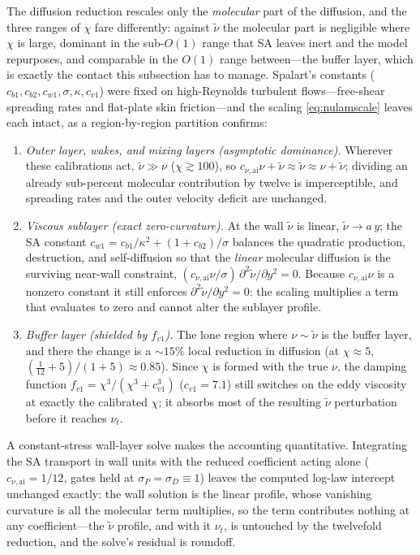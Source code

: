 \documentclass[journal]{new-aiaa}
\begin{document}
The diffusion reduction rescales only the \emph{molecular} part of the
diffusion, and the three ranges of $\chi$ fare differently: against
$\tilde\nu$ the molecular part is negligible where $\chi$ is large, dominant
in the sub-$O(1)$ range that SA leaves inert and the model repurposes, and
comparable in the $O(1)$ range between---the buffer layer, which is exactly
the contact this subsection has to manage.
Spalart's constants ($c_{b1},c_{b2},c_{w1},\sigma,\kappa,c_{v1}$) were fixed on
high-Reynolds turbulent flows---free-shear spreading rates and flat-plate skin
friction---and the scaling \eqref{eq:nulamscale} leaves each intact, as a
region-by-region partition confirms:
\begin{enumerate}
  \item \emph{Outer layer, wakes, and mixing layers (asymptotic dominance).}
  Wherever these calibrations act, $\tilde\nu\!\gg\!\nu$ ($\chi\!\gtrsim\!100$),
  so $c_{\nu,\mathrm{ai}}\nu+\tilde\nu\!\approx\!\tilde\nu\!\approx\!\nu+\tilde
  \nu$; dividing an already sub-percent molecular contribution by twelve is
  imperceptible, and spreading rates and the outer velocity deficit are
  unchanged.
  \item \emph{Viscous sublayer (exact zero-curvature).} At the wall $\tilde\nu$
  is linear, $\tilde\nu\!\to\!a\,y$; the SA constant
  $c_{w1}\!=\!c_{b1}/\kappa^2+(1+c_{b2})/\sigma$ balances the quadratic
  production, destruction, and self-diffusion so that the \emph{linear} molecular
  diffusion is the surviving near-wall constraint,
  $(c_{\nu,\mathrm{ai}}\nu/\sigma)\,\partial^2\tilde\nu/\partial y^2\!=\!0$.
  Because $c_{\nu,\mathrm{ai}}\nu$ is a nonzero constant it still enforces
  $\partial^2\tilde\nu/\partial y^2\!=\!0$: the scaling multiplies a term that
  evaluates to zero and cannot alter the sublayer profile.
  \item \emph{Buffer layer (shielded by $f_{v1}$).} The lone region where
  $\nu\!\sim\!\tilde\nu$ is the buffer layer, and there the change is a
  $\sim\!15\%$ local reduction in diffusion (at $\chi\!\approx\!5$,
  $(\tfrac{1}{12}+5)/(1+5)\!\approx\!0.85$). Since $\chi$ is formed with the true
  $\nu$, the damping function $f_{v1}\!=\!\chi^3/(\chi^3+c_{v1}^3)$
  ($c_{v1}\!=\!7.1$) still switches on the eddy viscosity at exactly the
  calibrated $\chi$; it absorbs most of the resulting $\tilde\nu$ perturbation
  before it reaches $\nu_t$.
\end{enumerate}
A constant-stress wall-layer solve makes the accounting quantitative. Integrating
the SA transport in wall units with the reduced coefficient acting alone
($c_{\nu,\mathrm{ai}}\!=\!1/12$, gates held at $\sigma_P\!=\!\sigma_D\!\equiv\!1$) leaves the
computed log-law intercept unchanged exactly: the wall solution is the
linear profile, whose vanishing curvature is all the molecular term
multiplies, so the term contributes nothing at any coefficient---the
$\tilde\nu$ profile, and with it $\nu_t$, is untouched by the twelvefold
reduction, and the solve's residual is roundoff.
\end{document}
